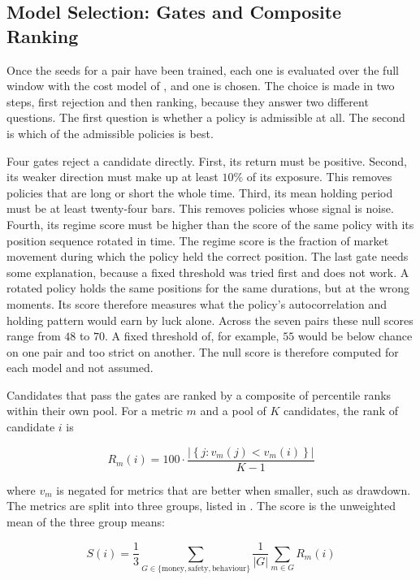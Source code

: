\subsection{Model Selection: Gates and Composite Ranking}

Once the seeds for a pair have been trained, each one is evaluated over the full window with the cost model of , and one is chosen. The choice is made in two steps, first rejection and then ranking, because they answer two different questions. The first question is whether a policy is admissible at all. The second is which of the admissible policies is best.

Four gates reject a candidate directly. First, its return must be positive. Second, its weaker direction must make up at least $10\%$ of its exposure. This removes policies that are long or short the whole time. Third, its mean holding period must be at least twenty-four bars. This removes policies whose signal is noise. Fourth, its regime score must be higher than the score of the same policy with its position sequence rotated in time. The regime score is the fraction of market movement during which the policy held the correct position. The last gate needs some explanation, because a fixed threshold was tried first and does not work. A rotated policy holds the same positions for the same durations, but at the wrong moments. Its score therefore measures what the policy's autocorrelation and holding pattern would earn by luck alone. Across the seven pairs these null scores range from $48$ to $70$. A fixed threshold of, for example, $55$ would be below chance on one pair and too strict on another. The null score is therefore computed for each model and not assumed.

Candidates that pass the gates are ranked by a composite of percentile ranks within their own pool. For a metric $m$ and a pool of $K$ candidates, the rank of candidate $i$ is

\begin{equation}
R_m(i) = 100 \cdot \frac{\left|\left\{ j : v_m(j) < v_m(i) \right\}\right|}{K - 1}
\label{Equation:PercentileRank}
\end{equation}

where $v_m$ is negated for metrics that are better when smaller, such as drawdown. The metrics are split into three groups, listed in . The score is the unweighted mean of the three group means:

\begin{equation}
S(i) = \frac{1}{3} \sum_{G \in \{\text{money}, \text{safety}, \text{behaviour}\}} \frac{1}{|G|} \sum_{m \in G} R_m(i)
\label{Equation:Composite}
\end{equation}

